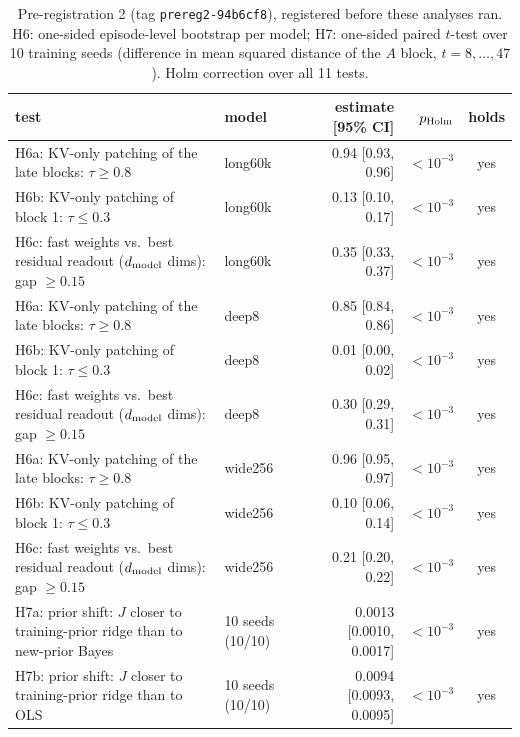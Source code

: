 \begin{table}[h]
\centering\footnotesize
\caption{Pre-registration 2 (tag \texttt{prereg2-94b6cf8}), registered before these analyses ran. H6: one-sided episode-level bootstrap per model; H7: one-sided paired $t$-test over 10 training seeds (difference in mean squared distance of the $A$ block, $t{=}8,\dots,47$). Holm correction over all 11 tests.}\label{tab:confirm}
\begin{tabular}{p{4.7cm}lrrc}
\toprule
test & model & estimate [95\% CI] & $p_{\rm Holm}$ & holds \\
\midrule
H6a: KV-only patching of the late blocks: $\tau\ge 0.8$ & long60k & 0.94 [0.93, 0.96] & $<10^{-3}$ & yes \\
H6b: KV-only patching of block 1: $\tau\le 0.3$ & long60k & 0.13 [0.10, 0.17] & $<10^{-3}$ & yes \\
H6c: fast weights vs.\ best residual readout ($d_{\rm model}$ dims): gap $\ge 0.15$ & long60k & 0.35 [0.33, 0.37] & $<10^{-3}$ & yes \\
H6a: KV-only patching of the late blocks: $\tau\ge 0.8$ & deep8 & 0.85 [0.84, 0.86] & $<10^{-3}$ & yes \\
H6b: KV-only patching of block 1: $\tau\le 0.3$ & deep8 & 0.01 [0.00, 0.02] & $<10^{-3}$ & yes \\
H6c: fast weights vs.\ best residual readout ($d_{\rm model}$ dims): gap $\ge 0.15$ & deep8 & 0.30 [0.29, 0.31] & $<10^{-3}$ & yes \\
H6a: KV-only patching of the late blocks: $\tau\ge 0.8$ & wide256 & 0.96 [0.95, 0.97] & $<10^{-3}$ & yes \\
H6b: KV-only patching of block 1: $\tau\le 0.3$ & wide256 & 0.10 [0.06, 0.14] & $<10^{-3}$ & yes \\
H6c: fast weights vs.\ best residual readout ($d_{\rm model}$ dims): gap $\ge 0.15$ & wide256 & 0.21 [0.20, 0.22] & $<10^{-3}$ & yes \\
H7a: prior shift: $J$ closer to training-prior ridge than to new-prior Bayes & 10 seeds (10/10) & 0.0013 [0.0010, 0.0017] & $<10^{-3}$ & yes \\
H7b: prior shift: $J$ closer to training-prior ridge than to OLS & 10 seeds (10/10) & 0.0094 [0.0093, 0.0095] & $<10^{-3}$ & yes \\
\bottomrule
\end{tabular}
\end{table}
